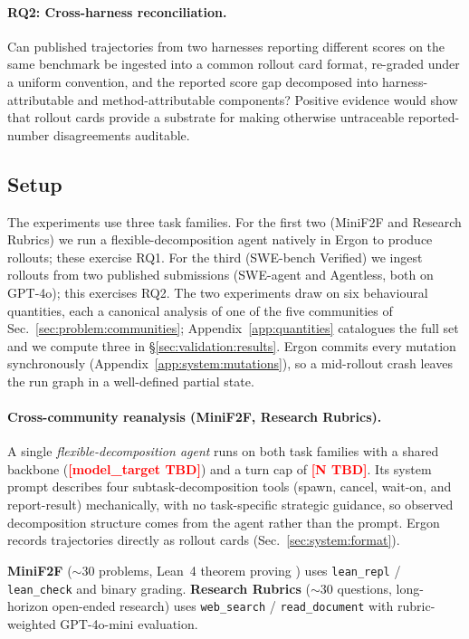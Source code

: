 \documentclass{article}
\newcommand{\expnum}[1]{\textcolor{red}{\textbf{[#1]}}}
\begin{document}
\paragraph{RQ2: Cross-harness reconciliation.} Can
published trajectories from two harnesses reporting different
scores on the same benchmark be ingested into a common rollout
card format, re-graded under a uniform convention, and the
reported score gap decomposed into harness-attributable and
method-attributable components? Positive evidence would show
that rollout cards provide a substrate for making otherwise
untraceable reported-number disagreements auditable.

\subsection{Setup}
\label{sec:validation:setup}

The experiments use three task families. For the first two
(MiniF2F and Research Rubrics) we run a flexible-decomposition
agent natively in Ergon to produce rollouts; these exercise
RQ1. For the third (SWE-bench Verified) we ingest rollouts from
two published submissions (SWE-agent and Agentless, both on
GPT-4o); this exercises RQ2. The two experiments draw on six
behavioural quantities, each a canonical analysis of one of the
five communities of Sec.~\ref{sec:problem:communities};
Appendix~\ref{app:quantities} catalogues the full set and we
compute three in \S\ref{sec:validation:results}. Ergon commits
every mutation synchronously
(Appendix~\ref{app:system:mutations}), so a mid-rollout crash
leaves the run graph in a well-defined partial state.

\paragraph{Cross-community reanalysis (MiniF2F, Research
Rubrics).} A single \emph{flexible-decomposition agent} runs
on both task families with a shared backbone
(\expnum{model\_target TBD}) and a turn cap of
\expnum{N TBD}. Its system prompt describes four
subtask-decomposition tools (spawn, cancel, wait-on, and
report-result) mechanically, with no task-specific strategic
guidance, so observed decomposition structure comes from the
agent rather than the prompt. Ergon records trajectories
directly as rollout cards (Sec.~\ref{sec:system:format}).

\textbf{MiniF2F} ($\sim$30 problems, Lean~4 theorem proving
\citep{zheng2022minif2f}) uses \texttt{lean\_repl} /
\texttt{lean\_check} and binary grading.
\textbf{Research Rubrics} ($\sim$30 questions, long-horizon
open-ended research) uses \texttt{web\_search} /
\texttt{read\_document} with rubric-weighted GPT-4o-mini
evaluation.
\end{document}
